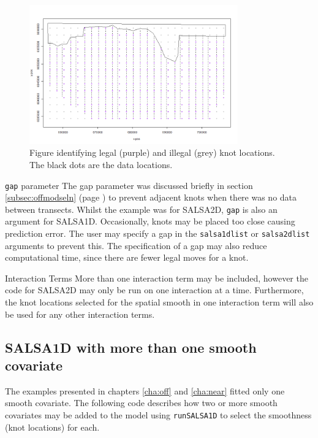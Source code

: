 \begin{figure}
\centering
\includegraphics[width=9cm]{knot3.png}
\caption{Figure identifying legal (purple) and illegal (grey) knot locations.  The black dots are the data locations.}
\label{fig:knot2}
\end{figure}

\begin{block}{{\tt gap} parameter}
The gap parameter was discussed briefly in section \ref{subsec:offmodseln} (page \pageref{gappage}) to prevent adjacent knots when there was no data between transects.  Whilst the example was for SALSA2D, {\tt gap} is also an argument for SALSA1D.  Occasionally, knots may be placed too close causing prediction error.  The user may specify a gap in the {\tt salsa1dlist} or {\tt salsa2dlist} arguments to prevent this.  The specification of a gap may also reduce computational time, since there are fewer legal moves for a knot.
\end{block}

\begin{block}{Interaction Terms}
More than one interaction term may be included, however the code for SALSA2D may only be run on one interaction at a time.  Furthermore, the knot locations selected for the spatial smooth in one interaction term will also be used for any other interaction terms.
\end{block}
\subsection{SALSA1D with more than one smooth covariate}

The examples presented in chapters \ref{cha:off} and \ref{cha:near} fitted only one smooth covariate.  The following code describes how two or more smooth covariates may be added to the model using {\tt runSALSA1D} to select the smoothness (knot locations) for each.\\

